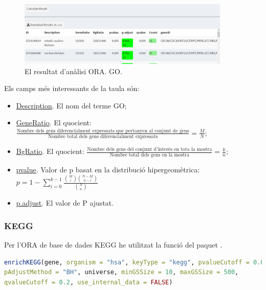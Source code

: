 \documentclass[]{article}
\begin{document}
\begin{figure}[h!]
\centering
\includegraphics[width=0.9\textwidth]{App_F6_Items_GO_ORA_Table.png} 
\caption{El resultat d'anàlisi ORA. GO.}
\end{figure}

Els camps més interessants de la taula són:

\begin{itemize}
\item \underline{Description}. El nom del terme GO;
\item \underline{GeneRatio}. El quocient: $\displaystyle\frac{\mbox{Nombre dels gens diferencialment expressats que pertanyen al conjunt de gens}}{\mbox{Nombre total dels gens diferencialment expressats}}=\frac{M}{N}$; 
\item \underline{BgRatio}. El quocient: $\displaystyle\frac{\mbox{Nombre dels gens del conjunt d'interès en tota la mostra}}{\mbox{Nombre total dels gens en la mostra}}=\frac{k}{n}$;
\item \underline{pvalue}. Valor de p basat en la distribució hipergeomètrica: $p = 1 - \displaystyle\sum_{i = 0}^{k-1}\frac{{M \choose i}{{N-M} \choose {n-i}}} {{N \choose n}}$
\item \underline{p.adjust}. El valor de P ajustat.
\end{itemize}

\subsubsection{KEGG}

Per l'ORA de base de dades KEGG he utilitzat la funció  del paquet . 

\begin{lstlisting}[language=R]
enrichKEGG(gene, organism = "hsa", keyType = "kegg", pvalueCutoff = 0.05, 
pAdjustMethod = "BH", universe, minGSSize = 10, maxGSSize = 500, 
qvalueCutoff = 0.2, use_internal_data = FALSE)
\end{lstlisting}
\end{document}
